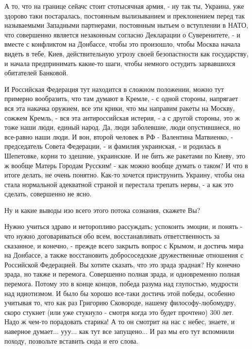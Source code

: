 А то, что на границе сейачс стоит стотысячная армия, - ну так ты, Украина, уже
здорово таки постаралась, постоянным вылизыванием и преклонением перед так
называемыми Западными партнерами, постоянным нытьем о вступлении в НАТО, что
совершенно является незаконным согласно Декларации о Суверенитете, - и вместе с
конфликтом на Донбассе, чтобы это произошло, чтобы Москва начала видеть в тебе,
Киев, действительную угрозу своей безопастности как государству, и начала
предпринимать какие-то шаги, чтобы немного остудить зарвавшихся обитателей
Банковой.

И Российская Федерация тут находится в сложном положении, можно тут примерно
вообразить, что там думают в Кремле, - с одной стороны, напрягает вся эта
накачка оружием, все эти крики, что мы направим ракеты на Москву, сожжем
Кремль, - вся эта антироссийская истерия, - а с другой стороны, это ж тоже наши
люди, единый народ. Да, люди заболевшие, люди опустившиеся, но все-равно наши
люди.  И вон, второй человек в РФ - Валентина Матвиенко, - председатель Совета
Федерации, - и фамилия украинская, - и родилась в Шепетовке, корни то здешние,
украинские. И не бить же ракетами по Киеву, это ж вообще Матерь Городам
Русским! - как можно вообще думать о таком? И что в итоге делать, не очень
понятно. Как-то хочется приструнить Украину, чтобы она стала нормальной
адекватной страной и перестала трепать нервы, - а как это сделать, совершенно
не ясно.

Ну и какие выводы изо всего этого потока сознания, скажете Вы? 

Нужно учиться здраво и неторопливо рассуждать; успокоить эмоции, и понять - что
нужно договариваться обо всем, восстанавливать ответственность за сказанное, и
конечно, - прежде всего закрыть вопрос с Крымом, и достичь мира на Донбассе, а
также восстановить добрососедские дружественные отношения с Российской
Федерацией. Вы хотите сказать, что это зрада зрадная? Ну конечно зрада, но
также и перемога. Совершенно полная зрада, и одновременно полная перемога.
Потому это в конце концов, победа разума над глупостью, мудрости над
идиотизмом. И было бы хорошо все-таки достичь этой победы, особенно учитывая
то, что как раз Григорию Сковороде, нашему философу-любомудру, скоро стукнет
(или уже стукнуло - смотря когда это будет прочтено) 300 лет. Надо ж чем-то
порадовать старика! А то он смотрит на нас с небес, знаете, и наверное
думает...  ууу...  как тут все запущено... И раз мы его тут вспомнили походу,
позвольте вставить сюда и его слова. 

